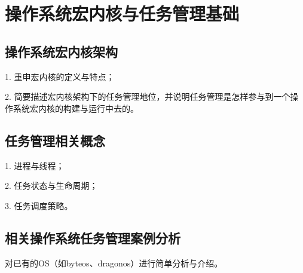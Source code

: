 
\chapter{操作系统宏内核与任务管理基础}

\section{操作系统宏内核架构}

1. 重申宏内核的定义与特点；

2. 简要描述宏内核架构下的任务管理地位，并说明任务管理是怎样参与到一个操作系统宏内核的构建与运行中去的。



\section{任务管理相关概念}

1. 进程与线程；

2. 任务状态与生命周期；

3. 任务调度策略。



\section{相关操作系统任务管理案例分析}

对已有的OS（如byteos、dragonos）进行简单分析与介绍。
